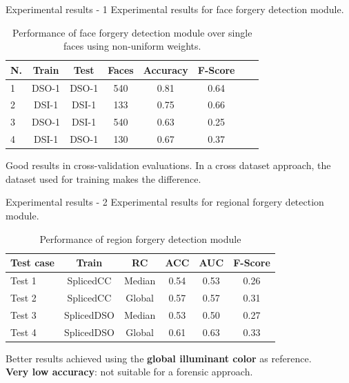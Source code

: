 \begin{tframe}{Experimental results - 1}
Experimental results for face forgery detection module.
\begin{footnotesize}
\begin{table}[h!]
\centering
\begin{tabular}{l c c c c c c c} 
\hline \hline 
\textbf{N.} & \textbf{Train} & \textbf{Test} & \textbf{Faces} & \textbf{Accuracy} & \textbf{F-Score} \\ [0.5ex]
\hline
1 & DSO-1 & DSO-1 &	540 & 0.81	& 0.64\\
2 & DSI-1 & DSI-1 &	133 & 0.75 & 0.66\\
3 &	DSO-1 & DSI-1 & 540 & 0.63 & 0.25\\ 
4 &	DSI-1 &	DSO-1 &	130 & 0.67 & 0.37\\[1ex]

\hline
\end{tabular}
\caption{Performance of face forgery detection module over single faces using non-uniform weights.}
\label{table:forgerydetections}
\end{table}
\end{footnotesize}
\vspace{0.2cm}
Good results in cross-validation evaluations. In a cross dataset approach, the dataset used for training makes the difference.
\end{tframe}


\begin{tframe}{Experimental results - 2}
Experimental results for regional forgery detection module. 
\begin{footnotesize}
\begin{table}[h!]
\centering
\begin{tabular}{l c c c c c} 
\hline \hline 
\textbf{Test case} & \textbf{Train} & \textbf{RC} & \textbf{ACC} & \textbf{AUC} &\textbf{ F-Score} \\ [0.5ex]
\hline
Test 1 & SplicedCC & Median & 0.54 & 0.53 & 0.26\\
Test 2 & SplicedCC & Global & 0.57 & 0.57 & 0.31\\
Test 3 &	 SplicedDSO & Median & 0.53 & 0.50 & 0.27\\
Test 4 &	 SplicedDSO & Global & 0.61 & 0.63 & 0.33\\ [1ex]
\hline
\end{tabular}
\caption{Performance of region forgery detection module}
\label{table:performanceregionaldet}
\end{table}
\end{footnotesize}
Better results achieved using the\textbf{ global illuminant color }as reference.\\

\vspace{0.2cm}
\textbf{Very low accuracy}: not suitable for a forensic approach.
\end{tframe}

